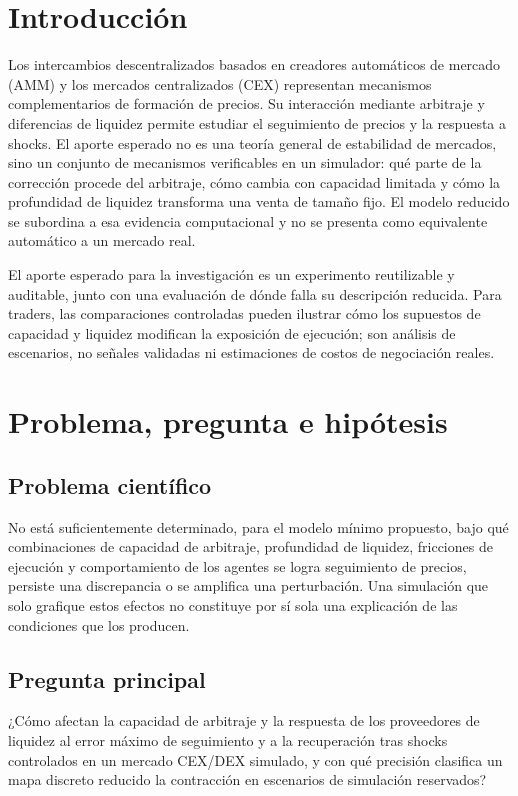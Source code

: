\section{Introducción}

Los intercambios descentralizados basados en creadores automáticos de mercado (AMM) y
los mercados centralizados (CEX) representan mecanismos complementarios de
formación de precios. Su interacción mediante arbitraje y diferencias de liquidez
permite estudiar el seguimiento de precios y la respuesta a shocks. El aporte esperado
no es una teoría general de estabilidad de mercados, sino un conjunto de mecanismos
verificables en un simulador: qué parte de la corrección procede del arbitraje, cómo
cambia con capacidad limitada y cómo la profundidad de liquidez transforma una venta
de tamaño fijo. El modelo reducido se subordina a esa evidencia computacional y no se
presenta como equivalente automático a un mercado real.

El aporte esperado para la investigación es un experimento reutilizable y auditable,
junto con una evaluación de dónde falla su descripción reducida. Para traders, las
comparaciones controladas pueden ilustrar cómo los supuestos de capacidad y liquidez
modifican la exposición de ejecución; son análisis de escenarios, no señales validadas
ni estimaciones de costos de negociación reales.

\section{Problema, pregunta e hipótesis}

\subsection{Problema científico}

No está suficientemente determinado, para el modelo mínimo propuesto, bajo qué
combinaciones de capacidad de arbitraje, profundidad de liquidez, fricciones de
ejecución y comportamiento de los agentes se logra seguimiento de precios, persiste
una discrepancia o se amplifica una perturbación. Una simulación que solo grafique
estos efectos no constituye por sí sola una explicación de las condiciones que los
producen.

\subsection{Pregunta principal}

¿Cómo afectan la capacidad de arbitraje y la respuesta de los proveedores de liquidez
al error máximo de seguimiento y a la recuperación tras shocks controlados en un mercado
CEX/DEX simulado, y con qué precisión clasifica un mapa discreto reducido la contracción
en escenarios de simulación reservados?

